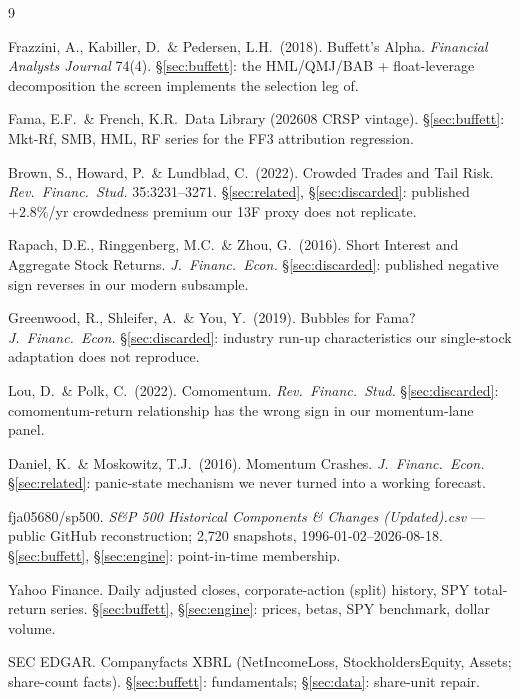 \documentclass[11pt,a4paper]{article}
\begin{document}
\begin{thebibliography}{9}

 Frazzini, A., Kabiller, D.\ \& Pedersen, L.H.\ (2018). Buffett's Alpha. \emph{Financial Analysts Journal} 74(4). \S\ref{sec:buffett}: the HML/QMJ/BAB + float-leverage decomposition the screen implements the selection leg of.

 Fama, E.F.\ \& French, K.R.\ Data Library (202608 CRSP vintage). \S\ref{sec:buffett}: Mkt-Rf, SMB, HML, RF series for the FF3 attribution regression.

 Brown, S., Howard, P.\ \& Lundblad, C.\ (2022). Crowded Trades and Tail Risk. \emph{Rev.\ Financ.\ Stud.} 35:3231--3271. \S\ref{sec:related}, \S\ref{sec:discarded}: published $+2.8\%$/yr crowdedness premium our 13F proxy does not replicate.

 Rapach, D.E., Ringgenberg, M.C.\ \& Zhou, G.\ (2016). Short Interest and Aggregate Stock Returns. \emph{J.\ Financ.\ Econ.} \S\ref{sec:discarded}: published negative sign reverses in our modern subsample.

 Greenwood, R., Shleifer, A.\ \& You, Y.\ (2019). Bubbles for Fama? \emph{J.\ Financ.\ Econ.} \S\ref{sec:discarded}: industry run-up characteristics our single-stock adaptation does not reproduce.

 Lou, D.\ \& Polk, C.\ (2022). Comomentum. \emph{Rev.\ Financ.\ Stud.} \S\ref{sec:discarded}: comomentum-return relationship has the wrong sign in our momentum-lane panel.

 Daniel, K.\ \& Moskowitz, T.J.\ (2016). Momentum Crashes. \emph{J.\ Financ.\ Econ.} \S\ref{sec:related}: panic-state mechanism we never turned into a working forecast.

 fja05680/sp500. \emph{S\&P 500 Historical Components \& Changes (Updated).csv} --- public GitHub reconstruction; 2,720 snapshots, 1996-01-02--2026-08-18. \S\ref{sec:buffett}, \S\ref{sec:engine}: point-in-time membership.

 Yahoo Finance. Daily adjusted closes, corporate-action (split) history, SPY total-return series. \S\ref{sec:buffett}, \S\ref{sec:engine}: prices, betas, SPY benchmark, dollar volume.

 SEC EDGAR. Companyfacts XBRL (NetIncomeLoss, StockholdersEquity, Assets; share-count facts). \S\ref{sec:buffett}: fundamentals; \S\ref{sec:data}: share-unit repair.

\end{thebibliography}
\end{document}
